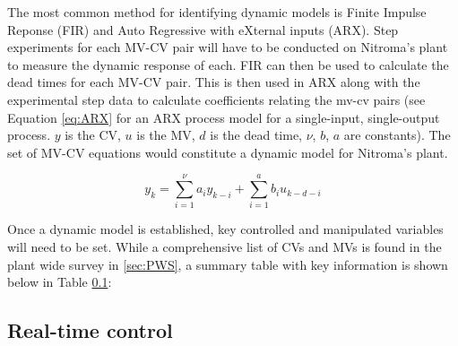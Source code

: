 The most common method for identifying dynamic models is Finite Impulse Reponse (FIR) and Auto Regressive with eXternal inputs (ARX). Step experiments for each MV-CV pair will have to be conducted on Nitroma's plant to measure the dynamic response of each. FIR can then be used to calculate the dead times for each MV-CV pair. This is then used in ARX along with the experimental step data to calculate coefficients relating the mv-cv pairs (see Equation \ref{eq:ARX} for an ARX process model for a single-input, single-output process. $y$ is the CV, $u$ is the MV, $d$ is the dead time, $\nu$, $b$, $a$ are constants). The set of MV-CV equations would constitute a dynamic model for Nitroma's plant. 

\begin{equation} \label{eq:ARX}
    y_k = \sum_{i=1}^{\nu}a_{i}y_{k-i} + \sum_{i=1}^{a}b_{i}u_{k-d-i}
\end{equation}

Once a dynamic model is established, key controlled and manipulated variables will need to be set. While a comprehensive list of CVs and MVs is found in the plant wide survey in \ref{sec:PWS}, a summary table with key information is shown below in Table \ref{}: 


\subsection{Real-time control}